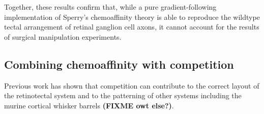 \documentclass[11pt, a4paper]{article}
\begin{document}
Together, these results confirm that, while a pure gradient-following
implementation of Sperry's chemoaffinity theory is able to reproduce the
wildtype tectal arrangement of retinal ganglion cell axons, it cannot account
for the results of surgical manipulation experiments.

\subsection*{Combining chemoaffinity with competition}

Previous work has shown that competition can contribute to the correct layout
of the retinotectal system \citep{stuff} and to the patterning of other
systems including the murine cortical whisker
barrels \citep{james_modelling_2020} \textbf{(FIXME owt else?)}.
\end{document}
